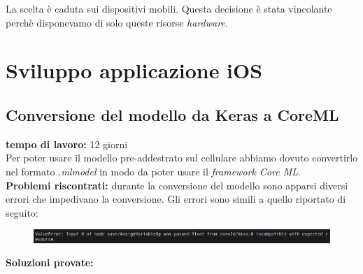 La scelta è caduta sui dispositivi mobili. Questa decisione è stata vincolante perchè disponevamo di solo queste risorse \textit{hardware}.

\section{Sviluppo applicazione iOS}
\subsection{Conversione del modello da Keras a CoreML}
\textbf{tempo di lavoro:} 12 giorni\\
\newline
Per poter usare il modello pre-addestrato sul cellulare abbiamo dovuto convertirlo nel formato \textit{.mlmodel} in modo da poter usare il \textit{framework Core ML}.\\
\newline
\textbf{Problemi riscontrati:} durante la conversione del modello sono apparsi diversi errori che impedivano la conversione. Gli errori sono simili a quello riportato di seguito:
\begin{figure}[H]
	\centering
	\includegraphics[scale=0.60]{./images/img1.png}
\end{figure}
\textbf{Soluzioni provate:}
